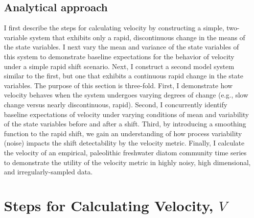 \documentclass[print]{nuthesis}
\begin{document}
\hypertarget{analytical-approach}{%
\subsection{Analytical approach}\label{analytical-approach}}

I first describe the steps for calculating velocity by constructing a simple, two-variable system that exhibits only a rapid, discontinuous change in the means of the state variables. I next vary the mean and variance of the state variables of this system to demonstrate baseline expectations for the behavior of velocity under a simple rapid shift scenario. Next, I construct a second model system similar to the first, but one that exhibits a continuous rapid change in the state variables. The purpose of this section is three-fold. First, I demonstrate how velocity behaves when the system undergoes varying degrees of change (e.g., slow change versus nearly discontinuous, rapid). Second, I concurrently identify baseline expectations of velocity under varying conditions of mean and variability of the state variables before and after a shift. Third, by introducing a smoothing function to the rapid shift, we gain an understanding of how process variability (noise) impacts the shift detectability by the velocity metric. Finally, I calculate the velocity of an empirical, paleolithic freshwater diatom community time series to demonstrate the utility of the velocity metric in highly noisy, high dimensional, and irregularly-sampled data.

\hypertarget{steps-for-calculating-velocity-v}{%
\section{\texorpdfstring{Steps for Calculating Velocity, \(V\)}{Steps for Calculating Velocity, V}}\label{steps-for-calculating-velocity-v}}
\end{document}
